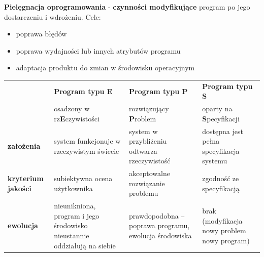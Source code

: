 \documentclass[a4paper]{article}
\begin{document}
    \textbf{Pielęgnacja oprogramowania} - \textbf{czynności modyfikujące} program
    po jego dostarczeniu i wdrożeniu. Cele:
    \begin{itemize}
        \item poprawa błędów
        \item poprawa wydajności lub innych atrybutów programu
        \item adaptacja produktu do zmian w środowisku operacyjnym
    \end{itemize}


    \begin{table}[H]
        \begin{center}
            \begin{tabular}{ p{2cm} | p{4cm} | p{4cm} | p{4cm}}
                & \textbf{Program typu E} & \textbf{Program typu P} & \textbf{Program typu S}\\
                & osadzony w rz\textbf{E}czywistości & rozwiązujący \textbf{P}roblem & oparty na \textbf{S}pecyfikacji\\
                \toprule
                \textbf{założenia} & system funkcjonuje w rzeczywistym świecie
                & system w przybliżeniu odtwarza rzeczywistość
                & dostępna jest pełna specyfikacja systemu
                \\

                \cmidrule(r){2-2}\cmidrule(rl){3-3}\cmidrule(l){4-4}

                \textbf{kryterium jakości} & subiektywna ocena użytkownika
                & akceptowalne rozwiązanie problemu
                & zgodność ze specyfikacją
                \\

                \cmidrule(r){2-2}\cmidrule(rl){3-3}\cmidrule(l){4-4}
                \textbf{ewolucja} & nieunikniona, program i jego środowisko nieustannie oddziałują na siebie
                &
                prawdopodobna – poprawa programu, ewolucja środowiska
                &
                brak (modyfikacja nowy problem nowy program)
                \\
            \end{tabular}
        \end{center}
    \end{table}
\end{document}
